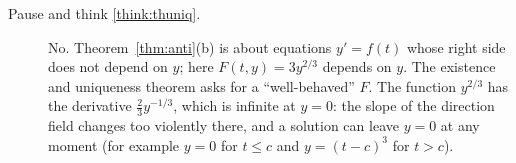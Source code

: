 \documentclass[11pt]{article}
\begin{document}
\begin{description}
  \item[Pause and think \ref{think:thuniq}.] No. Theorem~\ref{thm:anti}(b) is about equations $y'=f(t)$ whose right side does not depend on $y$; here $F(t,y)=3y^{2/3}$ depends on $y$. The existence and uniqueness theorem asks for a ``well-behaved'' $F$. The function $y^{2/3}$ has the derivative $\frac23y^{-1/3}$, which is infinite at $y=0$: the slope of the direction field changes too violently there, and a solution can leave $y=0$ at any moment (for example $y=0$ for $t\le c$ and $y=(t-c)^3$ for $t>c$).

\end{description}
\end{document}
